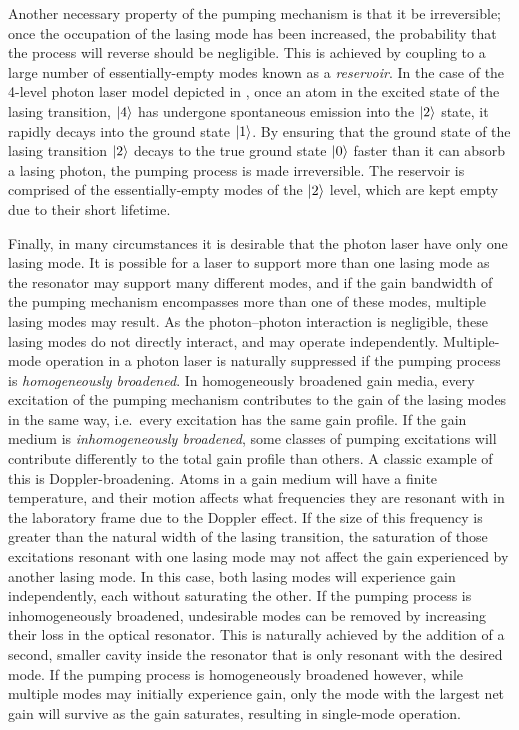 Another necessary property of the pumping mechanism is that it be irreversible; once the occupation of the lasing mode has been increased, the probability that the process will reverse should be negligible.  This is achieved by coupling to a large number of essentially-empty modes known as a \emph{reservoir}.  In the case of the 4-level photon laser model depicted in , once an atom in the excited state of the lasing transition, ${\left|4\right>}$ has undergone spontaneous emission into the ${\left|2\right>}$ state, it rapidly decays into the ground state ${\left|1\right>}$.  By ensuring that the ground state of the lasing transition ${\left|2\right>}$ decays to the true ground state ${\left|0\right>}$ faster than it can absorb a lasing photon, the pumping process is made irreversible.  The reservoir is comprised of the essentially-empty modes of the ${\left|2\right>}$ level, which are kept empty due to their short lifetime.

Finally, in many circumstances it is desirable that the photon laser have only one lasing mode.  It is possible for a laser to support more than one lasing mode as the resonator may support many different modes, and if the gain bandwidth of the pumping mechanism encompasses more than one of these modes, multiple lasing modes may result.  As the photon--photon interaction is negligible, these lasing modes do not directly interact, and may operate independently.  Multiple-mode operation in a photon laser is naturally suppressed if the pumping process is \emph{homogeneously broadened}.  In homogeneously broadened gain media, every excitation of the pumping mechanism contributes to the gain of the lasing modes in the same way, i.e.\ every excitation has the same gain profile.  If the gain medium is \emph{inhomogeneously broadened}, some classes of pumping excitations will contribute differently to the total gain profile than others.  A classic example of this is Doppler-broadening.  Atoms in a gain medium will have a finite temperature, and their motion affects what frequencies they are resonant with in the laboratory frame due to the Doppler effect.  If the size of this frequency is greater than the natural width of the lasing transition, the saturation of those excitations resonant with one lasing mode may not affect the gain experienced by another lasing mode.  In this case, both lasing modes will experience gain independently, each without saturating the other.  If the pumping process is inhomogeneously broadened, undesirable modes can be removed by increasing their loss in the optical resonator.  This is naturally achieved by the addition of a second, smaller cavity inside the resonator that is only resonant with the desired mode.  If the pumping process is homogeneously broadened however, while multiple modes may initially experience gain, only the mode with the largest net gain will survive as the gain saturates, resulting in single-mode operation.


